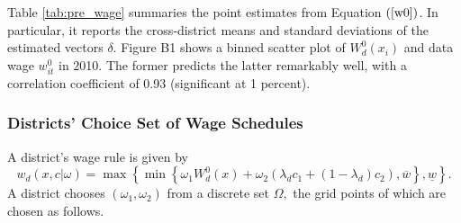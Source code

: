 \documentclass[notitlepage,12pt]{article}%
\begin{document}
Table \ref{tab:pre_wage} summaries the point estimates from Equation $\left(
\ref{w0}\right)  $. In particular, it reports the cross-district means and
standard deviations of the estimated vectors $\delta$. Figure B1 shows a
binned scatter plot of $W_{d}^{0}\left(  x_{i}\right)  $ and data wage
$w_{it}^{0}$ in 2010. The former predicts the latter remarkably well, with a
correlation coefficient of 0.93 (significant at 1 percent).

\subsubsection{Districts' Choice Set of Wage Schedules\label{wages}}

A district's wage rule is given by
\begin{equation}
w_{d}\left(  x,c|\omega\right)  =\max\left\{  \min\left\{  \omega_{1}W_{d}%
^{0}\left(  x\right)  +\omega_{2}\left(  \lambda_{d}c_{1}+\left(
1-\lambda_{d}\right)  c_{2}\right)  ,\overline{w}\right\}  ,\underline{w}%
\right\}  . \label{wrule}%
\end{equation}
A district chooses $\left(  \omega_{1},\omega_{2}\right)  $ from a discrete
set $\Omega,$ the grid points of which are chosen as follows.
\end{document}
